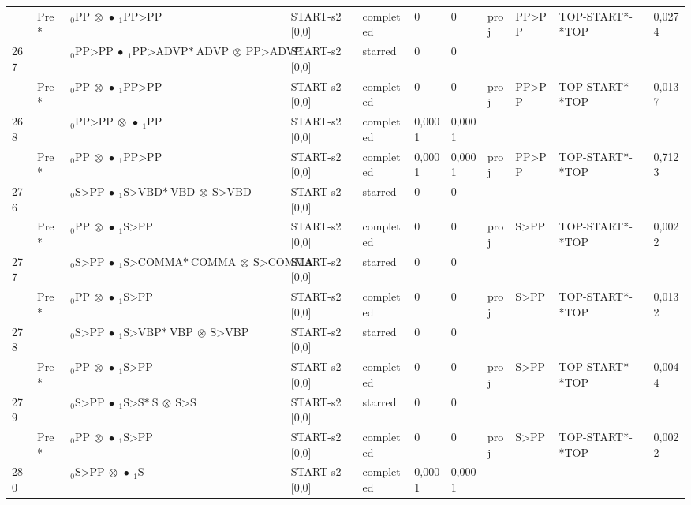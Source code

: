 \documentclass[10pt]{article}
\begin{document}
\begin{longtable}[htbp]{lllllllllll}
 & Pre *& $ {}_0 \textrm{PP} \  \otimes \  \bullet \ {}_{1} \textrm{PP>PP} $ & START-s2 [0,0] & completed & 0 & 0 & proj & PP>PP & TOP-START*-*TOP & 0,0274 \\ 
267 & & $ {}_0 \textrm{PP>PP} \  \bullet \ {}_{1} \textrm{PP>ADVP*} \ \textrm{ADVP} \  \otimes \ \textrm{PP>ADVP} $ & START-s2 [0,0] & starred & 0 & 0 & & & & \\ 
 & Pre *& $ {}_0 \textrm{PP} \  \otimes \  \bullet \ {}_{1} \textrm{PP>PP} $ & START-s2 [0,0] & completed & 0 & 0 & proj & PP>PP & TOP-START*-*TOP & 0,0137 \\ 
268 & & $ {}_0 \textrm{PP>PP} \  \otimes \  \bullet \ {}_{1} \textrm{PP} $ & START-s2 [0,0] & completed & 0,0001 & 0,0001 & & & & \\ 
 & Pre *& $ {}_0 \textrm{PP} \  \otimes \  \bullet \ {}_{1} \textrm{PP>PP} $ & START-s2 [0,0] & completed & 0,0001 & 0,0001 & proj & PP>PP & TOP-START*-*TOP & 0,7123 \\ 
276 & & $ {}_0 \textrm{S>PP} \  \bullet \ {}_{1} \textrm{S>VBD*} \ \textrm{VBD} \  \otimes \ \textrm{S>VBD} $ & START-s2 [0,0] & starred & 0 & 0 & & & & \\ 
 & Pre *& $ {}_0 \textrm{PP} \  \otimes \  \bullet \ {}_{1} \textrm{S>PP} $ & START-s2 [0,0] & completed & 0 & 0 & proj & S>PP & TOP-START*-*TOP & 0,0022 \\ 
277 & & $ {}_0 \textrm{S>PP} \  \bullet \ {}_{1} \textrm{S>COMMA*} \ \textrm{COMMA} \  \otimes \ \textrm{S>COMMA} $ & START-s2 [0,0] & starred & 0 & 0 & & & & \\ 
 & Pre *& $ {}_0 \textrm{PP} \  \otimes \  \bullet \ {}_{1} \textrm{S>PP} $ & START-s2 [0,0] & completed & 0 & 0 & proj & S>PP & TOP-START*-*TOP & 0,0132 \\ 
278 & & $ {}_0 \textrm{S>PP} \  \bullet \ {}_{1} \textrm{S>VBP*} \ \textrm{VBP} \  \otimes \ \textrm{S>VBP} $ & START-s2 [0,0] & starred & 0 & 0 & & & & \\ 
 & Pre *& $ {}_0 \textrm{PP} \  \otimes \  \bullet \ {}_{1} \textrm{S>PP} $ & START-s2 [0,0] & completed & 0 & 0 & proj & S>PP & TOP-START*-*TOP & 0,0044 \\ 
279 & & $ {}_0 \textrm{S>PP} \  \bullet \ {}_{1} \textrm{S>S*} \ \textrm{S} \  \otimes \ \textrm{S>S} $ & START-s2 [0,0] & starred & 0 & 0 & & & & \\ 
 & Pre *& $ {}_0 \textrm{PP} \  \otimes \  \bullet \ {}_{1} \textrm{S>PP} $ & START-s2 [0,0] & completed & 0 & 0 & proj & S>PP & TOP-START*-*TOP & 0,0022 \\ 
280 & & $ {}_0 \textrm{S>PP} \  \otimes \  \bullet \ {}_{1} \textrm{S} $ & START-s2 [0,0] & completed & 0,0001 & 0,0001 & & & & \\ 

\end{longtable}
\end{document}
